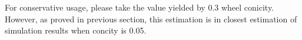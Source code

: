 For conservative usage, please take the value yielded by 0.3 wheel conicity. However, as proved in previous section, this estimation is in closest estimation of simulation results when concity is 0.05.






